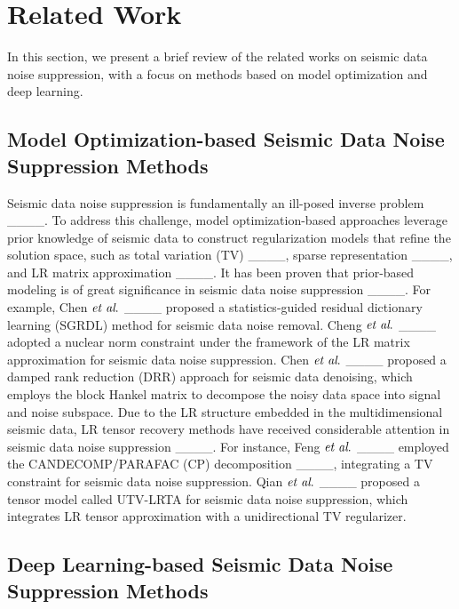 \section{Related Work}
\label{sec:2}
In this section, we present a brief review of the related works on seismic data noise suppression, with a focus on methods based on model optimization and deep learning.

\subsection{Model Optimization-based Seismic Data Noise Suppression Methods}

Seismic data noise suppression is fundamentally an ill-posed inverse problem ____. To address this challenge, model optimization-based approaches leverage prior knowledge of seismic data to construct regularization models that refine the solution space, such as total variation (TV) ____, sparse representation ____, and LR matrix approximation ____. It has been proven that prior-based modeling is of great significance in seismic data noise suppression ____. For example, Chen $\emph{et al}.$ ____ proposed a statistics-guided residual dictionary learning (SGRDL) method for seismic data noise removal. Cheng $\emph{et al}.$ ____ adopted a nuclear norm constraint under the framework of the LR matrix approximation for seismic data noise suppression. Chen $\emph{et al}.$ ____ proposed a damped rank reduction (DRR) approach for seismic data denoising, which employs the block Hankel matrix to decompose the noisy data space into signal and noise subspace. Due to the LR structure embedded in the multidimensional seismic data, LR tensor recovery methods have received considerable attention in seismic data noise suppression ____. For instance, Feng $\emph{et al}.$ ____ employed the CANDECOMP/PARAFAC (CP) decomposition ____, integrating a TV constraint for seismic data noise suppression. Qian $\emph{et al}.$ ____ proposed a tensor model called UTV-LRTA for seismic data noise suppression, which integrates LR tensor approximation with a unidirectional TV regularizer.


\subsection{Deep Learning-based Seismic Data Noise Suppression Methods}

